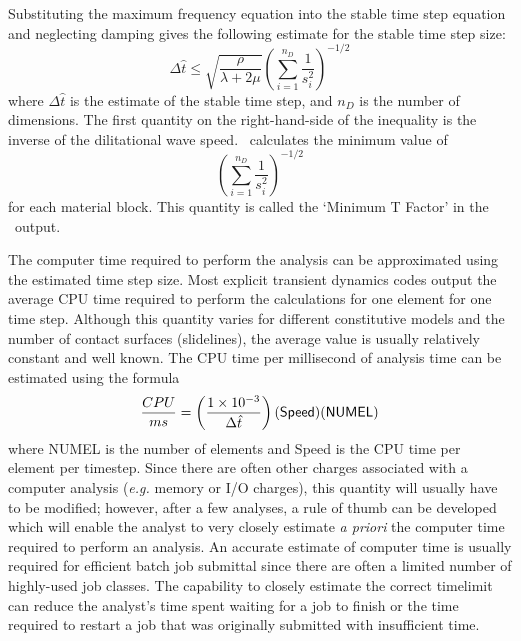 Substituting the maximum frequency equation into the stable time step
equation and neglecting damping gives the following estimate for the
stable time step size:
\begin{equation}
\Delta\hat t\le \sqrt{\frac{\rho}{\lambda+2\mu}}
      \left(\sum_{i=1}^{n_D}\frac{1}{s_i^2}\right)^{-1/2}
\end{equation}
where $\Delta\hat t$ is the estimate of the stable time step, and
$n_D$ is the number of dimensions.  The first quantity on the
right-hand-side of the inequality is the inverse of the dilitational
wave speed.  \NUM\ calculates the minimum value of
\begin{equation}
      \left(\sum_{i=1}^{n_D}\frac{1}{s_i^2}\right)^{-1/2}
\end{equation}
for each material block.  This quantity is called the `Minimum T
Factor' in the \NUM\ output.

The computer time required to perform the analysis can be approximated
using the estimated time step size.  Most explicit transient dynamics
codes output the average CPU time required to perform the calculations
for one element for one time step. Although this quantity varies for
different constitutive models and the number of contact surfaces
(slidelines), the average value is usually relatively constant and
well known.  The CPU time per millisecond of analysis time can be
estimated using the formula
\begin{equation}
{CPU\over ms} = \left(1\times10^{-3} \over \Delta\hat t\right)
                ({\sf Speed})({\sf NUMEL})
\end{equation}
where {\sf NUMEL} is the number of elements and {\sf Speed} is the CPU
time per element per timestep.  Since there are often other charges
associated with a computer analysis ({\it e.g.} memory or I/O
charges), this quantity will usually have to be modified; however,
after a few analyses, a rule of thumb can be developed which will
enable the analyst to very closely estimate {\it a priori} the
computer time required to perform an analysis.  An accurate estimate
of computer time is usually required for efficient batch job submittal
since there are often a limited number of highly-used job classes.
The capability to closely estimate the correct timelimit can reduce
the analyst's time spent waiting for a job to finish or the time
required to restart a job that was originally submitted with
insufficient time.

